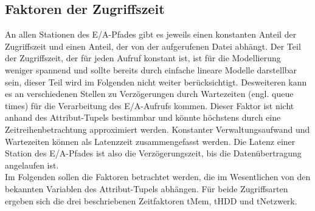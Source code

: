 \documentclass[
	12pt,
	a4paper,
	BCOR10mm,
	DIV14,
	listof=totoc,
	bibliography=totoc,
	headsepline
]{scrreprt}
\begin{document}
\subsection{Faktoren der Zugriffszeit}
An allen Stationen des E/A-Pfades gibt es jeweils einen konstanten Anteil der Zugriffszeit und einen Anteil, der von der aufgerufenen Datei abhängt. 
Der Teil der Zugriffszeit, der für jeden Aufruf konstant ist, ist für die Modellierung weniger spannend und sollte bereits durch einfache lineare Modelle darstellbar sein, dieser Teil wird im Folgenden nicht weiter berücksichtigt.
Desweiteren kann es an verschiedenen Stellen zu Verzögerungen durch Wartezeiten (engl. queue times) für die Verarbeitung des E/A-Aufrufs kommen. Dieser Faktor ist nicht anhand des Attribut-Tupels bestimmbar und könnte höchstens durch eine Zeitreihenbetrachtung approximiert werden. Konstanter Verwaltungsaufwand und Wartezeiten können als Latenzzeit zusammengefasst werden. Die Latenz einer Station des E/A-Pfades ist also die Verzögerungszeit, bis die Datenübertragung angelaufen ist.\\
Im Folgenden sollen die Faktoren betrachtet werden, die im Wesentlichen von den bekannten Variablen des Attribut-Tupels abhängen.
Für beide Zugriffsarten ergeben sich die drei beschriebenen Zeitfaktoren tMem, tHDD und tNetzwerk.
\end{document}

